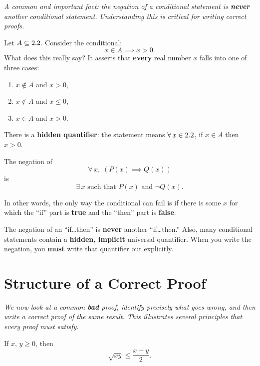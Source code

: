 \textit{A common and important fact: the negation of a conditional statement is \textbf{never} another conditional statement.  Understanding this is critical for writing correct proofs.}

Let $A \subseteq 2.2$.  Consider the conditional:
\[
  x \in A \implies x > 0.
\]
What does this really say?  It asserts that \textbf{every} real number $x$ falls into one of three cases:
\begin{enumerate}[label=(\roman*)]
  \item $x \notin A$ and $x > 0$,
  \item $x \notin A$ and $x \le 0$,
  \item $x \in A$ and $x > 0$.
\end{enumerate}
There is a \textbf{hidden quantifier}: the statement means $\forall\, x \in 2.2$, if $x \in A$ then $x > 0$.

\begin{theorem}
\label{thm:1-7}
The negation of
\[
  \forall\, x,\; (P(x) \implies Q(x))
\]
is
\[
  \exists\, x \text{ such that } P(x) \text{ and } \lnot Q(x).
\]
\end{theorem}

In other words, the only way the conditional can fail is if there is some $x$ for which the ``if'' part is \textbf{true} and the ``then'' part is \textbf{false}.

\begin{remark}[Warning]
The negation of an ``if\ldots then'' is \textbf{never} another ``if\ldots then.''  Also, many conditional statements contain a \textbf{hidden, implicit} universal quantifier.  When you write the negation, you \textbf{must} write that quantifier out explicitly.
\end{remark}

\section{Structure of a Correct Proof}
\label{sec:1.9}

\textit{We now look at a common \textbf{bad} proof, identify precisely what goes wrong, and then write a correct proof of the same result.  This illustrates several principles that every proof must satisfy.}

\begin{theorem}
\label{thm:1-8}
If $x,\,y \ge 0$, then
\[
  \sqrt{xy} \le \frac{x + y}{2}.
\]
\end{theorem}

